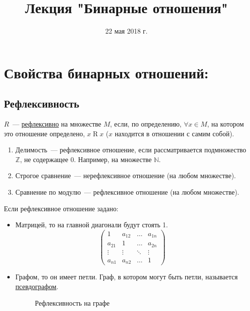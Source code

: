 \documentclass[russian]{lecture-notes}
\title{Лекция "Бинарные отношения"}
\date{22 мая 2018 г.}
\theoremstyle{definition}
\newcommand{\R}[2]{$#1\mathrel{R}#2$}
\begin{document}
	\maketitle


\section{Свойства бинарных отношений:}

\subsection{Рефлексивность}
\label{opr:refleks}
\begin{definition} 
	$R$~--- \underline{рефлексивно} на множестве $M$, если, по определению, $\forall x \in M$, на котором это отношение определено, \R{x}{x} ($x$ находится в отношении с самим собой).
\end{definition}

\begin{example}
	\begin{enumerate}
		\item Делимость~--- рефлексивное отношение, если рассматривается подмножество $\mathbb{Z}$, не содержащее 0. Например, на множестве $\mathbb{N}$.
		\item Строгое сравнение~--- нерефлексивное отношение (на любом множестве).
		\item Сравнение по модулю~--- рефлексивное отношение (на любом множестве).
	\end{enumerate}
\end{example}

Если рефлексивное отношение задано:
\begin{itemize}
	\item Матрицей, то на главной диагонали будут стоять 1.
	\begin{equation*}
	\left(
	\begin{array}{cccc}
	1 & a_{12} & \ldots & a_{1n}\\
	a_{21} & 1 & \ldots & a_{2n}\\
	\vdots & \vdots & \ddots & \vdots\\
	a_{n1} & a_{n2} & \ldots & 1
	\end{array}
	\right)
	\end{equation*}	
	
	\item Графом, то он имеет петли. Граф, в котором могут быть петли, называется \underline{псевдографом}.
	
	\begin{figure}[H]
		\centering
		\caption{Рефлексивность на графе}
		\label{fig:refleks}
	\end{figure}

\end{itemize}
\end{document}

